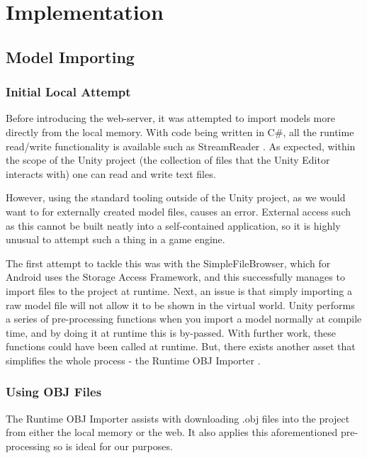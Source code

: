 \documentclass{article}
\begin{document}
\section{Implementation}
\label{implementation}

\subsection{Model Importing}
\label{modelimporting}

\subsubsection{Initial Local Attempt}
\label{initiallocalattempt}
Before introducing the web-server, it was attempted to import models more directly from the local memory. With code being written in C\#, all the runtime read/write functionality is available such as StreamReader \cite{models:streamreader}. As expected, within the scope of the Unity project (the collection of files that the Unity Editor interacts with) one can read and write text files.

However, using the standard tooling outside of the Unity project, as we would want to for externally created model files, causes an error. External access such as this cannot be built neatly into a self-contained application, so it is highly unusual to attempt such a thing in a game engine. 

The first attempt to tackle this was with the SimpleFileBrowser, which for Android uses the Storage Access Framework, and this successfully manages to import files to the project at runtime. Next, an issue is that simply importing a raw model file will not allow it to be shown in the virtual world. Unity performs a series of pre-processing functions when you import a model normally at compile time, and by doing it at runtime this is by-passed. With further work, these functions could have been called at runtime. But, there exists another asset that simplifies the whole process - the Runtime OBJ Importer \cite{models:objimporter}.

\subsubsection{Using OBJ Files}
The Runtime OBJ Importer assists with downloading .obj files into the project from either the local memory or the web. It also applies this aforementioned pre-processing so is ideal for our purposes. 
\end{document}
